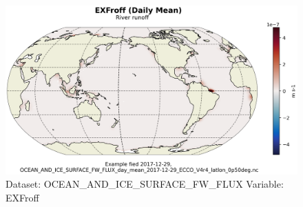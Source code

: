 \begin{figure}[H]
\centering
\includegraphics[scale=0.55]{../images/plots/latlon_plots/Ocean_and_Sea-Ice_Surface_Freshwater_Fluxes/EXFroff.png}
\caption{Dataset: OCEAN\_AND\_ICE\_SURFACE\_FW\_FLUX Variable: EXFroff}
\label{tab:table-OCEAN_AND_ICE_SURFACE_FW_FLUX_EXFroff-Plot}
\end{figure}
\pagebreak
